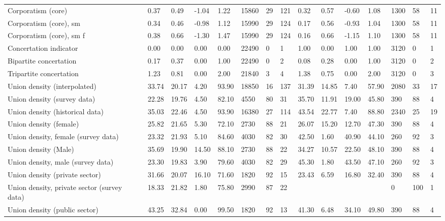 \begin{longtable}{lllllllllllllll}
Corporatism (core) & 0.37 & 0.49 & -1.04 & 1.22 & 15860 & 29 & 121 & 0.32 & 0.57 & -0.60 & 1.08 & 1300 & 58 & 11\\
\addlinespace
Corporatism (core), sm & 0.34 & 0.46 & -0.98 & 1.12 & 15990 & 29 & 124 & 0.17 & 0.56 & -0.93 & 1.04 & 1300 & 58 & 11\\
Corporatism (core), sm f & 0.38 & 0.66 & -1.30 & 1.47 & 15990 & 29 & 124 & 0.16 & 0.66 & -1.15 & 1.10 & 1300 & 58 & 11\\
Concertation indicator & 0.00 & 0.00 & 0.00 & 0.00 & 22490 & 0 & 1 & 1.00 & 0.00 & 1.00 & 1.00 & 3120 & 0 & 1\\
Bipartite concertation & 0.17 & 0.37 & 0.00 & 1.00 & 22490 & 0 & 2 & 0.08 & 0.28 & 0.00 & 1.00 & 3120 & 0 & 2\\
Tripartite concertation & 1.23 & 0.81 & 0.00 & 2.00 & 21840 & 3 & 4 & 1.38 & 0.75 & 0.00 & 2.00 & 3120 & 0 & 3\\
\addlinespace
Union density (interpolated) & 33.74 & 20.17 & 4.20 & 93.90 & 18850 & 16 & 137 & 31.39 & 14.85 & 7.40 & 57.90 & 2080 & 33 & 17\\
Union density (survey data) & 22.28 & 19.76 & 4.50 & 82.10 & 4550 & 80 & 31 & 35.70 & 11.91 & 19.00 & 45.80 & 390 & 88 & 4\\
Union density (historical data) & 35.03 & 22.46 & 4.50 & 93.90 & 16380 & 27 & 114 & 43.54 & 22.77 & 7.40 & 88.80 & 2340 & 25 & 19\\
Union density (female) & 25.82 & 21.65 & 5.30 & 72.10 & 2730 & 88 & 21 & 26.07 & 15.20 & 12.70 & 47.30 & 390 & 88 & 4\\
Union density, female (survey data) & 23.32 & 21.93 & 5.10 & 84.60 & 4030 & 82 & 30 & 42.50 & 1.60 & 40.90 & 44.10 & 260 & 92 & 3\\
\addlinespace
Union density (Male) & 35.69 & 19.90 & 14.50 & 88.10 & 2730 & 88 & 22 & 34.27 & 10.57 & 22.50 & 48.10 & 390 & 88 & 4\\
Union density, male (survey data) & 23.30 & 19.83 & 3.90 & 79.60 & 4030 & 82 & 29 & 45.30 & 1.80 & 43.50 & 47.10 & 260 & 92 & 3\\
Union density (private sector) & 31.66 & 20.07 & 16.10 & 71.60 & 1820 & 92 & 15 & 23.43 & 6.59 & 16.80 & 32.40 & 390 & 88 & 4\\
Union density, private sector (survey data) & 18.33 & 21.82 & 1.80 & 75.80 & 2990 & 87 & 22 &  &  &  &  & 0 & 100 & 1\\
Union density (public sector) & 43.25 & 32.84 & 0.00 & 99.50 & 1820 & 92 & 13 & 41.30 & 6.48 & 34.10 & 49.80 & 390 & 88 & 4\\

\end{longtable}
